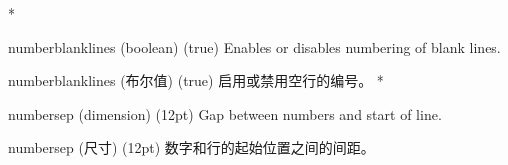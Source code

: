 \begin{optionlist}
\begin{paracol}{2}
\switchcolumn[0]*%
  \item[numberblanklines (boolean) (true)]
    Enables or disables numbering of blank lines.
    \switchcolumn
    \item[numberblanklines (布尔值) (true)]
    启用或禁用空行的编号。
\switchcolumn[0]*%
  \item[numbersep (dimension) (12pt)]
    Gap between numbers and start of line.
    \switchcolumn
    \item[numbersep (尺寸) (12pt)]
    数字和行的起始位置之间的间距。
  


\end{paracol}

\end{optionlist}
